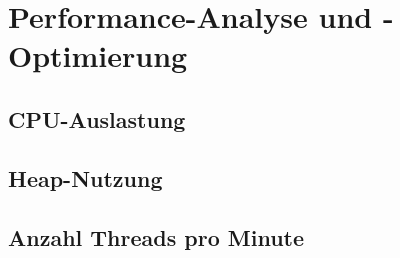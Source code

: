 \section{Performance-Analyse und -Optimierung}

\subsection{CPU-Auslastung}

\subsection{Heap-Nutzung}

\subsection{Anzahl Threads pro Minute}